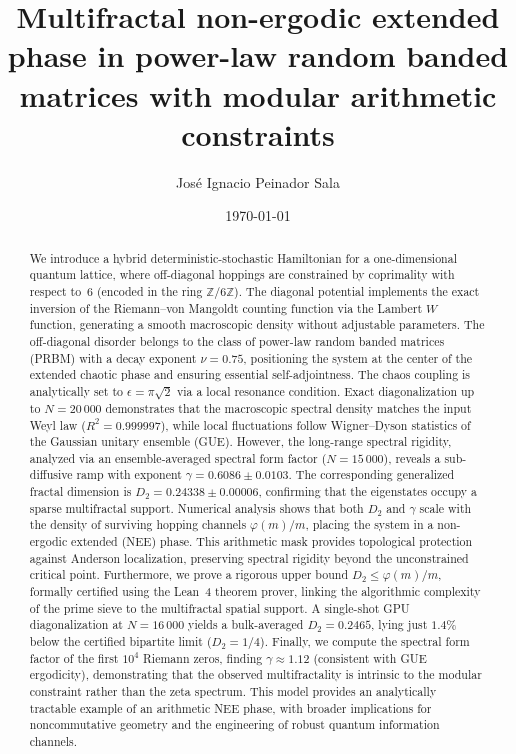 \documentclass[11pt,a4paper]{article}
\begin{document}
\title{\textbf{Multifractal non-ergodic extended phase in power-law random banded matrices with modular arithmetic constraints}}

\author{José Ignacio Peinador Sala }

\date{\today}

\maketitle

\begin{abstract}
We introduce a hybrid deterministic-stochastic Hamiltonian for a one-dimensional quantum lattice, where off-diagonal hoppings are constrained by coprimality with respect to~6 (encoded in the ring $\mathbb{Z}/6\mathbb{Z}$). The diagonal potential implements the exact inversion of the Riemann--von Mangoldt counting function via the Lambert $W$ function, generating a smooth macroscopic density without adjustable parameters. The off-diagonal disorder belongs to the class of power-law random banded matrices (PRBM) with a decay exponent $\nu=0.75$, positioning the system at the center of the extended chaotic phase and ensuring essential self-adjointness. The chaos coupling is analytically set to $\epsilon = \pi\sqrt{2}$ via a local resonance condition. Exact diagonalization up to $N=20\,000$ demonstrates that the macroscopic spectral density matches the input Weyl law ($R^2=0.999997$), while local fluctuations follow Wigner--Dyson statistics of the Gaussian unitary ensemble (GUE). However, the long-range spectral rigidity, analyzed via an ensemble-averaged spectral form factor ($N=15\,000$), reveals a sub-diffusive ramp with exponent $\gamma = 0.6086 \pm 0.0103$. The corresponding generalized fractal dimension is $D_2 = 0.24338 \pm 0.00006$, confirming that the eigenstates occupy a sparse multifractal support. Numerical analysis shows that both $D_2$ and $\gamma$ scale with the density of surviving hopping channels $\varphi(m)/m$, placing the system in a non-ergodic extended (NEE) phase. This arithmetic mask provides topological protection against Anderson localization, preserving spectral rigidity beyond the unconstrained critical point. Furthermore, we prove a rigorous upper bound $D_2 \le \varphi(m)/m$, formally certified using the Lean~4 theorem prover, linking the algorithmic complexity of the prime sieve to the multifractal spatial support. A single-shot GPU diagonalization at $N=16\,000$ yields a bulk-averaged $D_2 = 0.2465$, lying just $1.4\%$ below the certified bipartite limit ($D_2 = 1/4$). Finally, we compute the spectral form factor of the first $10^4$ Riemann zeros, finding $\gamma \approx 1.12$ (consistent with GUE ergodicity), demonstrating that the observed multifractality is intrinsic to the modular constraint rather than the zeta spectrum. This model provides an analytically tractable example of an arithmetic NEE phase, with broader implications for noncommutative geometry and the engineering of robust quantum information channels.


\end{abstract}
\end{document}
